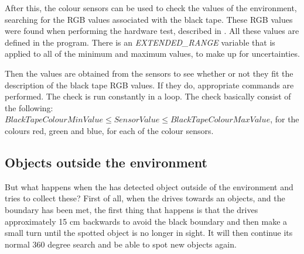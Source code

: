 After this, the colour sensors can be used to check the values of the environment, searching for the RGB values associated with the black tape. These RGB values were found when performing the hardware test, described in . All these values are defined in the program. There is an \emph{EXTENDED\_RANGE} variable that is applied to all of the minimum and maximum values, to make up for uncertainties. 

Then the values are obtained from the sensors to see whether or not they fit the description of the black tape RGB values. If they do, appropriate commands are performed. The check is run constantly in a loop. The check basically consist of the following: $BlackTapeColourMinValue \leq SensorValue \leq BlackTapeColourMaxValue$, for the colours red, green and blue, for each of the colour sensors. 

\subsection{Objects outside the environment}
But what happens when the \projname{} has detected object outside of the environment and tries to collect these? First of all, when the \projname{} drives towards an objects, and the boundary has been met, the first thing that happens is that the \projname{} drives approximately 15 cm backwards to avoid the black boundary and then make a small turn until the spotted object is no longer in sight. It will then continue its normal 360 degree search and be able to spot new objects again.

